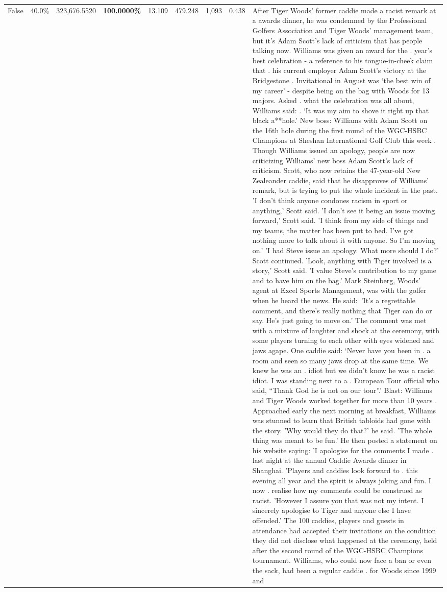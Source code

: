 \begin{table}[H]
\begin{tabular}{lllrlllll}
False & 40.0\% & 323,676.5520 & \bfseries \color{red} 100.0000\% & 13.109 & 479.248 & 1,093 & 0.438 & After Tiger Woods' former caddie made a racist remark at a awards dinner, he was condemned by the Professional Golfers Association and Tiger Woods' management team, but it's Adam Scott's lack of criticism that has people talking now. Williams was given an award for the . year’s best celebration - a reference to his tongue-in-cheek claim that . his current employer Adam Scott’s victory at the Bridgestone . Invitational in August was ‘the best win of my career’ - despite being on the bag with Woods for 13 majors. Asked . what the celebration was all about, Williams said: . ‘It was my aim to shove it right up that black a**hole.’ New boss: Williams with Adam Scott  on the 16th hole during the first round of the WGC-HSBC Champions at Sheshan International Golf Club this week . Though Williams issued an apology, people are now criticizing Williams' new boss Adam Scott's lack of criticism. Scott, who now retains the 47-year-old New Zealeander caddie, said that he disapproves of Williams' remark, but is trying to put the whole incident in the past. 'I don't think anyone condones racism in sport or anything,' Scott said. 'I don't see it being an issue moving forward,' Scott said. 'I think from my side of things and my teams, the matter has been put to bed. I've got nothing more to talk about it with anyone. So I'm moving on.' 'I had Steve issue an apology. What more should I do?' Scott continued. 'Look, anything with Tiger involved is a story,' Scott said. 'I value Steve's contribution to my game and to have him on the bag.' Mark Steinberg, Woods' agent at Excel Sports Management, was with the golfer when he heard the news. He said: 'It's a regrettable comment, and there's really nothing that Tiger can do or say. He's just going to move on.' The comment was met with a mixture of laughter and shock at the ceremony, with some players turning to each other with eyes widened and jaws agape. One caddie said: ‘Never have you been in . a room and seen so many jaws drop at the same time. We knew he was an . idiot but we didn’t know he was a racist idiot. I was standing next to a . European Tour official who said, “Thank God he is not on our tour”.’ Blast: Williams and Tiger Woods worked together for more than 10 years . Approached early the next morning at breakfast, Williams was stunned to learn that British tabloids had gone with the story. 'Why would they do that?' he said. 'The whole thing was meant to be fun.' He then posted a statement on his website saying: 'I apologise for the comments I made . last night at the annual Caddie Awards dinner in Shanghai. 'Players and caddies look forward to . this evening all year and the spirit is always joking and fun. I now . realise how my comments could be construed as racist. 'However I assure you that was not my intent. I sincerely apologise to Tiger and anyone else I have offended.' The 100 caddies, players and guests in attendance had accepted their invitations on the condition they did not disclose what happened at the ceremony, held after the second round of the WGC-HSBC Champions tournament. Williams, who could now face a ban or even the sack, had been a regular caddie . for Woods since 1999 and 
\end{tabular}
\end{table}

